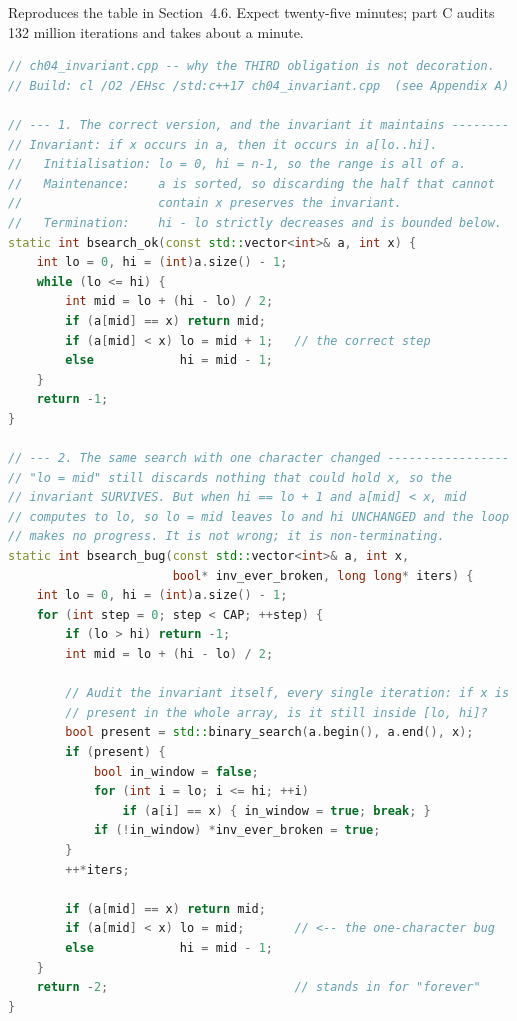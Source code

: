 \begin{lab}
Reproduces the table in Section~4.6. Expect twenty-five minutes; part C audits
132 million iterations and takes about a minute.

\begin{lstlisting}[language=C++]
// ch04_invariant.cpp -- why the THIRD obligation is not decoration.
// Build: cl /O2 /EHsc /std:c++17 ch04_invariant.cpp  (see Appendix A)

// --- 1. The correct version, and the invariant it maintains --------
// Invariant: if x occurs in a, then it occurs in a[lo..hi].
//   Initialisation: lo = 0, hi = n-1, so the range is all of a.
//   Maintenance:    a is sorted, so discarding the half that cannot
//                   contain x preserves the invariant.
//   Termination:    hi - lo strictly decreases and is bounded below.
static int bsearch_ok(const std::vector<int>& a, int x) {
    int lo = 0, hi = (int)a.size() - 1;
    while (lo <= hi) {
        int mid = lo + (hi - lo) / 2;
        if (a[mid] == x) return mid;
        if (a[mid] < x) lo = mid + 1;   // the correct step
        else            hi = mid - 1;
    }
    return -1;
}

// --- 2. The same search with one character changed -----------------
// "lo = mid" still discards nothing that could hold x, so the
// invariant SURVIVES. But when hi == lo + 1 and a[mid] < x, mid
// computes to lo, so lo = mid leaves lo and hi UNCHANGED and the loop
// makes no progress. It is not wrong; it is non-terminating.
static int bsearch_bug(const std::vector<int>& a, int x,
                       bool* inv_ever_broken, long long* iters) {
    int lo = 0, hi = (int)a.size() - 1;
    for (int step = 0; step < CAP; ++step) {
        if (lo > hi) return -1;
        int mid = lo + (hi - lo) / 2;

        // Audit the invariant itself, every single iteration: if x is
        // present in the whole array, is it still inside [lo, hi]?
        bool present = std::binary_search(a.begin(), a.end(), x);
        if (present) {
            bool in_window = false;
            for (int i = lo; i <= hi; ++i)
                if (a[i] == x) { in_window = true; break; }
            if (!in_window) *inv_ever_broken = true;
        }
        ++*iters;

        if (a[mid] == x) return mid;
        if (a[mid] < x) lo = mid;       // <-- the one-character bug
        else            hi = mid - 1;
    }
    return -2;                          // stands in for "forever"
}


\end{lstlisting}
\end{lab}
